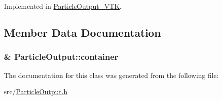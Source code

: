 Implemented in \hyperlink{classParticleOutput__VTK_a56219fd326e37e78eff344765552a29a}{Particle\-Output\-\_\-\-V\-T\-K}.



\subsection{Member Data Documentation}
\hypertarget{classParticleOutput_a07b2fe0d460ee8935ce5852ddd4adbd3}{
\subsubsection[{container}]{\& Particle\-Output\-::container\hspace{0.3cm}{\ttfamily [protected]}}}\label{classParticleOutput_a07b2fe0d460ee8935ce5852ddd4adbd3}


The documentation for this class was generated from the following file\-:\begin{DoxyCompactItemize}
\item 
src/\hyperlink{ParticleOutput_8h}{Particle\-Output.\-h}\end{DoxyCompactItemize}
